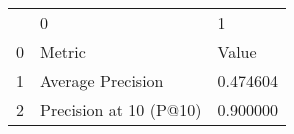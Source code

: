 \begin{tabular}{lll}
 & 0 & 1 \\
0 & Metric & Value \\
1 & Average Precision & 0.474604 \\
2 & Precision at 10 (P@10) & 0.900000 \\
\end{tabular}
